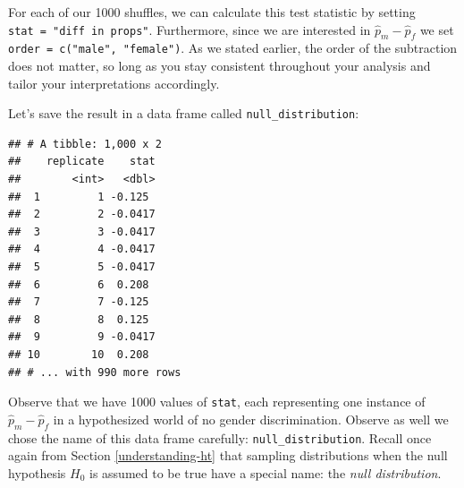 \documentclass[
]{book}
\newenvironment{Shaded}{\begin{snugshade}}{\end{snugshade}}
\newcommand{\DataTypeTok}[1]{\textcolor[rgb]{0.13,0.29,0.53}{#1}}
\newcommand{\DecValTok}[1]{\textcolor[rgb]{0.00,0.00,0.81}{#1}}
\newcommand{\KeywordTok}[1]{\textcolor[rgb]{0.13,0.29,0.53}{\textbf{#1}}}
\newcommand{\NormalTok}[1]{#1}
\newcommand{\OperatorTok}[1]{\textcolor[rgb]{0.81,0.36,0.00}{\textbf{#1}}}
\newcommand{\StringTok}[1]{\textcolor[rgb]{0.31,0.60,0.02}{#1}}
\begin{document}
For each of our 1000 shuffles, we can calculate this test statistic by setting \texttt{stat\ =\ "diff\ in\ props"}. Furthermore, since we are interested in \(\widehat{p}_{m} - \widehat{p}_{f}\) we set \texttt{order\ =\ c("male",\ "female")}. As we stated earlier, the order of the subtraction does not matter, so long as you stay consistent throughout your analysis and tailor your interpretations accordingly.

Let's save the result in a data frame called \texttt{null\_distribution}:

\begin{Shaded}
\end{Shaded}

\begin{verbatim}
## # A tibble: 1,000 x 2
##    replicate    stat
##        <int>   <dbl>
##  1         1 -0.125 
##  2         2 -0.0417
##  3         3 -0.0417
##  4         4 -0.0417
##  5         5 -0.0417
##  6         6  0.208 
##  7         7 -0.125 
##  8         8  0.125 
##  9         9 -0.0417
## 10        10  0.208 
## # ... with 990 more rows
\end{verbatim}

Observe that we have 1000 values of \texttt{stat}, each representing one instance of \(\widehat{p}_{m} - \widehat{p}_{f}\) in a hypothesized world of no gender discrimination. Observe as well we chose the name of this data frame carefully: \texttt{null\_distribution}. Recall once again from Section \ref{understanding-ht} that sampling distributions when the null hypothesis \(H_0\) is assumed to be true have a special name: the \emph{null distribution}.
\end{document}
